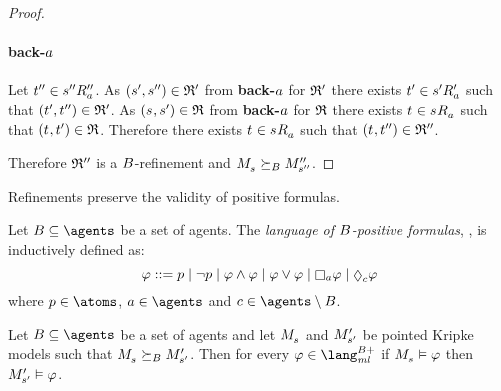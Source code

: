 \begin{proof}
\paragraph{back-$a$}
Let ${t}^{\prime\prime} \in {{s}^{\prime\prime}} {R^{\prime\prime}_{a}}$.
As $({s}^{\prime}, {s}^{\prime\prime}) \in \mathfrak{R}'$ from {\bf back-$a$} for $\mathfrak{R}'$ there exists ${t}^{\prime} \in {{s}^{\prime}} {R^{\prime}_{a}}$ such that $({t}^{\prime}, {t}^{\prime\prime}) \in \mathfrak{R}'$.
As $(\kStateS, \kStateSP) \in \refinement$ from {\bf back-$a$} for $\mathfrak{R}$ there exists $\kStateT \in \kSuccessorsA{\kStateS}$ such that $(\kStateT, \kStateTP) \in \refinement$.
Therefore there exists $\kStateT \in \kSuccessorsA{\kStateS}$ such that $(\kStateT, \kStateTPP) \in \refinement''$.

Therefore $\mathfrak{R}''$ is a $B$-refinement and $\kPModel{\kStateS} \simulatesBs \kPModelPP{\kStateSPP}$. 
\end{proof}

Refinements preserve the validity of positive formulas.

\begin{definition}
Let $\agentsB \subseteq \agents$ be a set of agents.
The {\em language of $B$-positive formulas}, \langMlPlusBs{}, is inductively defined as:
$$
\phi ::= 
    \atomP \mid
    \lnot \atomP \mid
    \phi \land \phi \mid
    \phi \lor \phi \mid
    \necessaryA \phi \mid
    \possibleC \phi
$$
where $\atomP \in \atoms$, $\agentA \in \agents$ and $\agentC \in \agents \setminus \agentsB$.
\end{definition}

\begin{proposition}\label{refinements-preserve-positive}
Let $\agentsB \subseteq \agents$ be a set of agents and let $\kPModel{\kStateS}$ and ${M^{\prime}_{{s}^{\prime}}}$ be pointed Kripke models such that $\kPModel{\kStateS} \simulatesBs \kPModelP{\kStateSP}$.
Then for every $\phi \in \langMlPlusBs$
if $\kPModel{\kStateS} \entails \phi$ then ${M^{\prime}_{{s}^{\prime}}} \vDash \varphi$.
\end{proposition}


